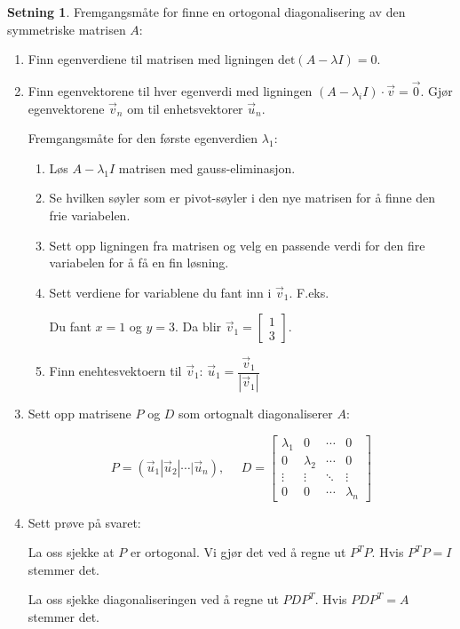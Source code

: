 \documentclass[11pt]{article}
\theoremstyle{definition}
\theoremstyle{definition}
\theoremstyle{definition}
\newtheorem{minset}{Setning}[section]
\newenvironment{fminset}
{\begin{mdframed}[style=minstil]\begin{minset}}
		{\end{minset}\end{mdframed}}
\theoremstyle{definition}
\theoremstyle{definition}
\theoremstyle{definition}
\begin{document}
		\begin{fminset}
			Fremgangsmåte for finne en ortogonal diagonalisering av den symmetriske matrisen \(A\):
			\begin{enumerate}
				\item Finn egenverdiene til matrisen med ligningen \(\text{det}(A-\lambda I)=0\).
				\item Finn egenvektorene til hver egenverdi med ligningen \((A-\lambda_iI)\cdot \vec{v}=\vec{0} \). Gjør egenvektorene \(\vec{v}_n\) om til enhetsvektorer \(\vec{u}_n \).
				
				Fremgangsmåte for den første egenverdien \(\lambda_1 \): 
				\begin{enumerate}
					\item Løs \(A-\lambda_1I\) matrisen med gauss-eliminasjon.
					\item Se hvilken søyler som er pivot-søyler i den nye matrisen for å finne den frie variabelen.
					\item Sett opp ligningen fra matrisen og velg en passende verdi for den fire variabelen for å få en fin løsning.
					\item Sett verdiene for variablene du fant inn i \(\vec{v}_1 \). F.eks. 
					
					Du fant \(x=1\) og \(y=3\). Da blir \(\vec{v}_1=\left[\begin{array}{rr} 
					1  \\
					3 
					\end{array} \right] \).
					\item Finn enehtesvektoern til \(\vec{v}_1 \): \(\vec{u}_1=\dfrac{\vec{v}_1}{|\vec{v}_1|} \)
				\end{enumerate}
				\item Sett opp matrisene \(P\) og \(D\) som ortognalt diagonaliserer \(A\):
				
				\[P=\left(\vec{u}_1|\vec{u}_2|\cdots|\vec{u}_n \right),\hspace{16pt} D=\left[\begin{array}{cccc} 
				\lambda_1 & 0 & \cdots & 0 \\
				0 & \lambda_2 & \cdots & 0 \\
				\vdots & \vdots & \ddots & \vdots \\
				0 & 0 & \cdots & \lambda_n
				\end{array} \right]\]
				\item Sett prøve på svaret:
				
				La oss sjekke at \(P\) er ortogonal. Vi gjør det ved å regne ut \(P^TP\). Hvis \(P^TP=I\) stemmer det.
				
				La oss sjekke diagonaliseringen ved å regne ut \(PDP^T\). Hvis \(PDP^T=A\) stemmer det.
			\end{enumerate}
		\end{fminset}
		
\end{document}

